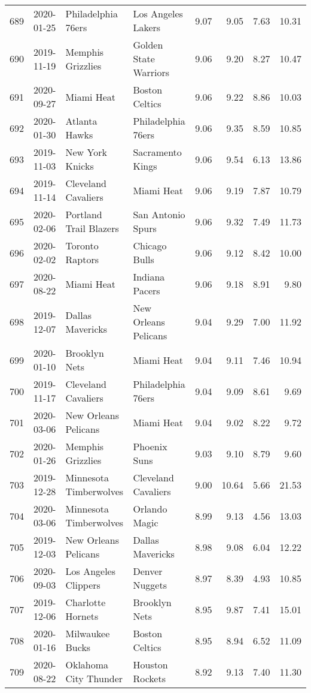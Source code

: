 \documentclass[
  11pt,
]{article}
\theoremstyle{nonumberplain}
\begin{document}
\begin{longtable}{rl|llr|rrr}
689 & 2020-01-25 & Philadelphia 76ers & Los Angeles Lakers & 9.07 & 9.05 & 7.63 & 10.31\\
690 & 2019-11-19 & Memphis Grizzlies & Golden State Warriors & 9.06 & 9.20 & 8.27 & 10.47\\
691 & 2020-09-27 & Miami Heat & Boston Celtics & 9.06 & 9.22 & 8.86 & 10.03\\
692 & 2020-01-30 & Atlanta Hawks & Philadelphia 76ers & 9.06 & 9.35 & 8.59 & 10.85\\
693 & 2019-11-03 & New York Knicks & Sacramento Kings & 9.06 & 9.54 & 6.13 & 13.86\\
694 & 2019-11-14 & Cleveland Cavaliers & Miami Heat & 9.06 & 9.19 & 7.87 & 10.79\\
695 & 2020-02-06 & Portland Trail Blazers & San Antonio Spurs & 9.06 & 9.32 & 7.49 & 11.73\\
696 & 2020-02-02 & Toronto Raptors & Chicago Bulls & 9.06 & 9.12 & 8.42 & 10.00\\
697 & 2020-08-22 & Miami Heat & Indiana Pacers & 9.06 & 9.18 & 8.91 & 9.80\\
698 & 2019-12-07 & Dallas Mavericks & New Orleans Pelicans & 9.04 & 9.29 & 7.00 & 11.92\\
699 & 2020-01-10 & Brooklyn Nets & Miami Heat & 9.04 & 9.11 & 7.46 & 10.94\\
700 & 2019-11-17 & Cleveland Cavaliers & Philadelphia 76ers & 9.04 & 9.09 & 8.61 & 9.69\\
701 & 2020-03-06 & New Orleans Pelicans & Miami Heat & 9.04 & 9.02 & 8.22 & 9.72\\
702 & 2020-01-26 & Memphis Grizzlies & Phoenix Suns & 9.03 & 9.10 & 8.79 & 9.60\\
703 & 2019-12-28 & Minnesota Timberwolves & Cleveland Cavaliers & 9.00 & 10.64 & 5.66 & 21.53\\
704 & 2020-03-06 & Minnesota Timberwolves & Orlando Magic & 8.99 & 9.13 & 4.56 & 13.03\\
705 & 2019-12-03 & New Orleans Pelicans & Dallas Mavericks & 8.98 & 9.08 & 6.04 & 12.22\\
706 & 2020-09-03 & Los Angeles Clippers & Denver Nuggets & 8.97 & 8.39 & 4.93 & 10.85\\
707 & 2019-12-06 & Charlotte Hornets & Brooklyn Nets & 8.95 & 9.87 & 7.41 & 15.01\\
708 & 2020-01-16 & Milwaukee Bucks & Boston Celtics & 8.95 & 8.94 & 6.52 & 11.09\\
709 & 2020-08-22 & Oklahoma City Thunder & Houston Rockets & 8.92 & 9.13 & 7.40 & 11.30\\

\end{longtable}
\end{document}
